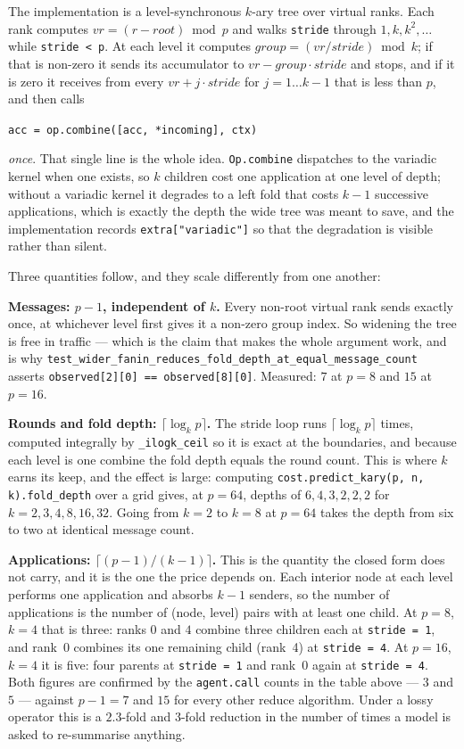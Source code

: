 \documentclass[11pt]{article}
\begin{document}
The implementation is a level-synchronous $k$-ary tree over virtual ranks. Each rank computes
$vr = (r - \mathit{root}) \bmod p$ and walks \texttt{stride} through $1, k, k^2, \dots$ while
\texttt{stride < p}. At each level it computes $\mathit{group} = (vr / \mathit{stride}) \bmod k$;
if that is non-zero it sends its accumulator to
$vr - \mathit{group}\cdot\mathit{stride}$ and stops, and if it is zero it receives from every
$vr + j\cdot\mathit{stride}$ for $j = 1 \dots k-1$ that is less than $p$, and then calls

\begin{center}
\texttt{acc = op.combine([acc, *incoming], ctx)}
\end{center}

\emph{once}. That single line is the whole idea. \texttt{Op.combine} dispatches to the variadic
kernel when one exists, so $k$ children cost one application at one level of depth; without a
variadic kernel it degrades to a left fold that costs $k-1$ successive applications, which is
exactly the depth the wide tree was meant to save, and the implementation records
\texttt{extra["variadic"]} so that the degradation is visible rather than silent.

Three quantities follow, and they scale differently from one another:

\textbf{Messages: $p-1$, independent of $k$.} Every non-root virtual rank sends exactly once,
at whichever level first gives it a non-zero group index. So widening the tree is free in
traffic --- which is the claim that makes the whole argument work, and is why
\texttt{test\_wider\_fanin\_reduces\_fold\_depth\_at\_equal\_message\_count} asserts
\texttt{observed[2][0] == observed[8][0]}. Measured: $7$ at $p=8$ and $15$ at $p=16$.

\textbf{Rounds and fold depth: $\lceil\log_k p\rceil$.} The stride loop runs
$\lceil\log_k p\rceil$ times, computed integrally by \texttt{\_ilogk\_ceil} so it is exact at
the boundaries, and because each level is one combine the fold depth equals the round count.
This is where $k$ earns its keep, and the effect is large: computing
\texttt{cost.predict\_kary(p, n, k).fold\_depth} over a grid gives, at $p=64$, depths of
$6, 4, 3, 2, 2, 2$ for $k = 2, 3, 4, 8, 16, 32$. Going from $k=2$ to $k=8$ at $p=64$ takes the
depth from six to two at identical message count.

\textbf{Applications: $\lceil (p-1)/(k-1) \rceil$.} This is the quantity the closed form does
not carry, and it is the one the price depends on. Each interior node at each level performs
one application and absorbs $k-1$ senders, so the number of applications is the number of
(node, level) pairs with at least one child. At $p=8$, $k=4$ that is three: ranks $0$ and $4$
combine three children each at \texttt{stride = 1}, and rank~0 combines its one remaining child
(rank~4) at \texttt{stride = 4}. At $p=16$, $k=4$ it is five: four parents at
\texttt{stride = 1} and rank~0 again at \texttt{stride = 4}. Both figures are confirmed by the
\texttt{agent.call} counts in the table above --- $3$ and $5$ --- against $p-1 = 7$ and $15$ for
every other reduce algorithm. Under a lossy operator this is a $2.3$-fold and $3$-fold
reduction in the number of times a model is asked to re-summarise anything.
\end{document}
